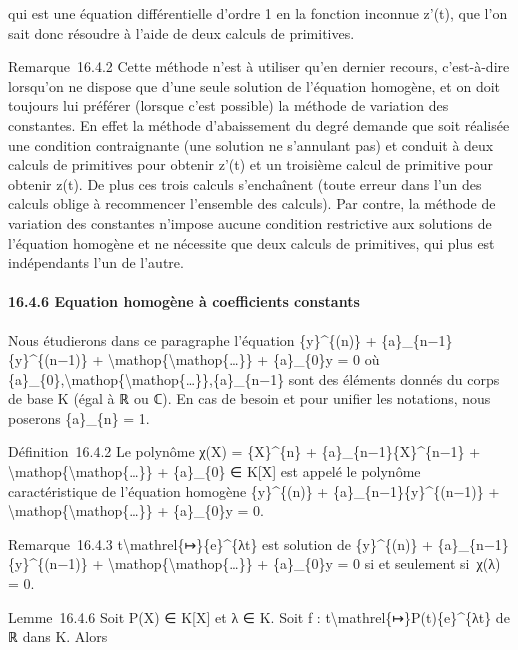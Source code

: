 \documentclass[]{article}
\begin{document}
qui est une équation différentielle d'ordre 1 en la fonction inconnue
z'(t), que l'on sait donc résoudre à l'aide de deux calculs de
primitives.

Remarque~16.4.2 Cette méthode n'est à utiliser qu'en dernier recours,
c'est-à-dire lorsqu'on ne dispose que d'une seule solution de l'équation
homogène, et on doit toujours lui préférer (lorsque c'est possible) la
méthode de variation des constantes. En effet la méthode d'abaissement
du degré demande que soit réalisée une condition contraignante (une
solution ne s'annulant pas) et conduit à deux calculs de primitives pour
obtenir z'(t) et un troisième calcul de primitive pour obtenir z(t). De
plus ces trois calculs s'enchaînent (toute erreur dans l'un des calculs
oblige à recommencer l'ensemble des calculs). Par contre, la méthode de
variation des constantes n'impose aucune condition restrictive aux
solutions de l'équation homogène et ne nécessite que deux calculs de
primitives, qui plus est indépendants l'un de l'autre.

\paragraph{16.4.6 Equation homogène à coefficients constants}

Nous étudierons dans ce paragraphe l'équation \{y\}\^{}\{(n)\} +
\{a\}\_\{n−1\}\{y\}\^{}\{(n−1)\} +
\textbackslash{}mathop\{\textbackslash{}mathop\{\ldots{}\}\} +
\{a\}\_\{0\}y = 0 où
\{a\}\_\{0\},\textbackslash{}mathop\{\textbackslash{}mathop\{\ldots{}\}\},\{a\}\_\{n−1\}
sont des éléments donnés du corps de base K (égal à ℝ ou ℂ). En cas de
besoin et pour unifier les notations, nous poserons \{a\}\_\{n\} = 1.

Définition~16.4.2 Le polynôme χ(X) = \{X\}\^{}\{n\} +
\{a\}\_\{n−1\}\{X\}\^{}\{n−1\} +
\textbackslash{}mathop\{\textbackslash{}mathop\{\ldots{}\}\} +
\{a\}\_\{0\} ∈ K{[}X{]} est appelé le polynôme caractéristique de
l'équation homogène \{y\}\^{}\{(n)\} + \{a\}\_\{n−1\}\{y\}\^{}\{(n−1)\}
+ \textbackslash{}mathop\{\textbackslash{}mathop\{\ldots{}\}\} +
\{a\}\_\{0\}y = 0.

Remarque~16.4.3 t\textbackslash{}mathrel\{↦\}\{e\}\^{}\{λt\} est
solution de \{y\}\^{}\{(n)\} + \{a\}\_\{n−1\}\{y\}\^{}\{(n−1)\} +
\textbackslash{}mathop\{\textbackslash{}mathop\{\ldots{}\}\} +
\{a\}\_\{0\}y = 0 si et seulement si~χ(λ) = 0.

Lemme~16.4.6 Soit P(X) ∈ K{[}X{]} et λ ∈ K. Soit f :
t\textbackslash{}mathrel\{↦\}P(t)\{e\}\^{}\{λt\} de ℝ dans K. Alors
\end{document}
